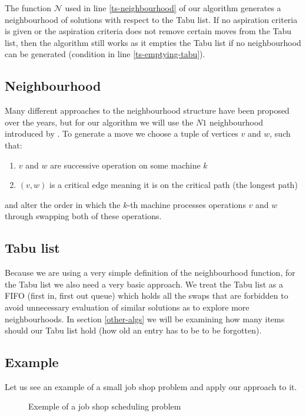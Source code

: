 \documentclass[14pt]{article}
\begin{document}
The function $\mathcal{N}$ used in line \ref{ts-neighbourhood} of our algorithm generates a neighbourhood of solutions with respect to the Tabu list. If no aspiration criteria is given or the aspiration criteria does not remove certain moves from the Tabu list, then the algorithm still works as it empties the Tabu list if no neighbourhood can be generated (condition in line \ref{ts-emptying-tabu}).

\subsection{Neighbourhood}

Many different approaches to the neighbourhood structure have been proposed over the years, but for our algorithm we will use the $N1$ neighbourhood introduced by \citet[section 3.3]{laarhoven}.
To generate a move we choose a tuple of vertices $v$ and $w$, such that:
\begin{enumerate}
  \item $v$ and $w$ are successive operation on some machine $k$
  \item $(v,w)$ is a critical edge meaning it is on the critical path (the longest path)
\end{enumerate}
and alter the order in which the $k$-th machine processes operations $v$ and $w$ through swapping both of these operations.

\subsection{Tabu list}

Because we are using a very simple definition of the neighbourhood function, for the Tabu list we also need a very basic approach. We treat the Tabu list as a FIFO (first in, first out queue) which holds all the swaps that are forbidden to avoid unnecessary evaluation of similar solutions as to explore more neighbourhoods. In section \ref{other-algs} we will be examining how many items should our Tabu list hold (how old an entry has to be to be forgotten).

\subsection{Example}

Let us see an example of a small job shop problem and apply our approach to it.

\begin{figure}[H]
  \centering
  \def\svgwidth{0.5\columnwidth}
  
  \caption{Exemple of a job shop scheduling problem}
  \label{ts-sol-1}
\end{figure}
\end{document}
